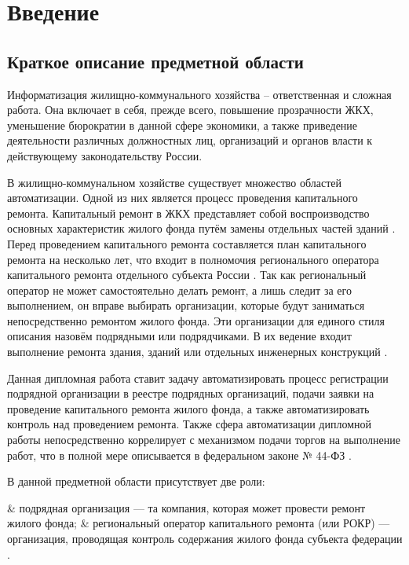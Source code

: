 \section*{Введение}

\subsection*{Краткое описание предметной области}

Информатизация жилищно-коммунального хозяйства – ответственная и сложная работа.
Она включает в себя, прежде всего, повышение прозрачности ЖКХ, уменьшение бюрократии в данной сфере экономики, а также приведение деятельности различных должностных лиц, организаций и органов власти к действующему законодательству России.

В жилищно-коммунальном хозяйстве существует множество областей автоматизации.
Одной из них является процесс проведения капитального ремонта.
Капитальный ремонт в ЖКХ представляет собой воспроизводство основных характеристик жилого фонда путём замены отдельных частей зданий \cite{economicdict}.
Перед проведением капитального ремонта составляется план капитального ремонта на несколько лет, что входит в полномочия регионального оператора капитального ремонта отдельного субъекта России \cite[ст. 180]{fz188}.
Так как региональный оператор не может самостоятельно делать ремонт, а лишь следит за его выполнением, он вправе выбирать организации, которые будут заниматься непосредственно ремонтом жилого фонда.
Эти организации для единого стиля описания назовём подрядными или подрядчиками.
В их ведение входит выполнение ремонта здания, зданий или отдельных инженерных конструкций \cite{analog_spb}.

Данная дипломная работа ставит задачу автоматизировать процесс регистрации подрядной организации в реестре подрядных организаций, подачи заявки на проведение капитального ремонта жилого фонда, а также автоматизировать контроль над проведением ремонта.
Также сфера автоматизации дипломной работы непосредственно коррелирует с механизмом подачи торгов на выполнение работ, что в полной мере описывается в федеральном законе № 44-ФЗ \cite{fz44}.

В данной предметной области присутствует две роли:

\begin{easylist}
& подрядная организация --- та компания, которая может провести ремонт жилого фонда;
& региональный оператор капитального ремонта (или РОКР) --- организация, проводящая контроль содержания жилого фонда субъекта федерации \cite[ст. 178, ст.180]{fz188}.
\end{easylist}

